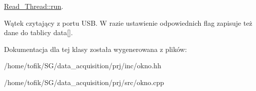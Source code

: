 \hyperlink{class_read___thread_a261a3cc9c3dc6abe61946123c3de76dc}{Read\-\_\-\-Thread\-::run}. 

Wątek czytający z portu U\-S\-B. W razie ustawienie odpowiednich flag zapisuje też dane do tablicy data\mbox{[}\mbox{]}. 

Dokumentacja dla tej klasy została wygenerowana z plików\-:\begin{DoxyCompactItemize}
\item 
/home/tofik/\-S\-G/data\-\_\-acquisition/prj/inc/okno.\-hh\item 
/home/tofik/\-S\-G/data\-\_\-acquisition/prj/src/okno.\-cpp\end{DoxyCompactItemize}
